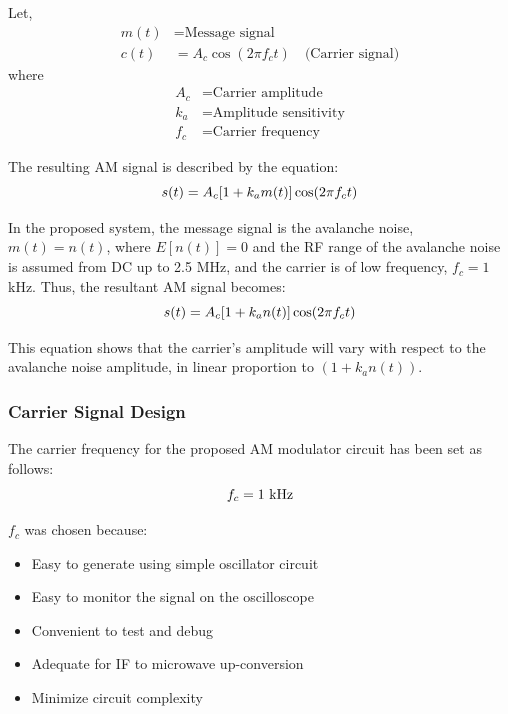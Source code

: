\documentclass[12pt,a4paper]{report}
\begin{document}
	Let,
	\begin{align*}
		m(t) &= \text{Message signal} \\
		c(t) &= A_c \cos(2\pi f_c t) \quad \text{(Carrier signal)}
	\end{align*}
	where
	\begin{align*}
		A_c &= \text{Carrier amplitude} \\
		k_a &= \text{Amplitude sensitivity} \\
		f_c &= \text{Carrier frequency}
	\end{align*}
	
	The resulting AM signal is described by the equation:
	\begingroup
	\setlength{\mathindent}{0pt}
	\begin{equation*}
		\hfill
		s(t) = A_c [1 + k_a m(t)] \cos(2\pi f_c t)
		\hfill
	\end{equation*}
	\endgroup
	
	In the proposed system, the message signal is the avalanche noise, $m(t) = n(t)$, where $E[n(t)] = 0$ and the RF range of the avalanche noise is assumed from DC up to 2.5 MHz, and the carrier is of low frequency, $f_c = 1$ kHz. Thus, the resultant AM signal becomes:
	\begingroup
	\setlength{\mathindent}{0pt}
	\begin{equation*}
		\hfill
		s(t) = A_c [1 + k_a n(t)] \cos(2\pi f_c t)
		\hfill
	\end{equation*}
	\endgroup
	
	This equation shows that the carrier's amplitude will vary with respect to the avalanche noise amplitude, in linear proportion to $(1 + k_a n(t))$.
	
	\subsubsection{Carrier Signal Design}
	The carrier frequency for the proposed AM modulator circuit has been set as follows:
	\begingroup
	\setlength{\mathindent}{0pt}
	\begin{equation*}
		\hfill
		f_c = 1\ \text{kHz}
		\hfill
	\end{equation*}
	\endgroup
	
	$f_c$ was chosen because:
	\begin{itemize}
		\item Easy to generate using simple oscillator circuit
		\item Easy to monitor the signal on the oscilloscope
		\item Convenient to test and debug
		\item Adequate for IF to microwave up-conversion
		\item Minimize circuit complexity
	\end{itemize}
	
\end{document}
